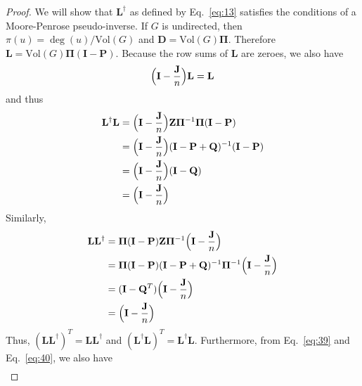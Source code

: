 \documentclass[10pt,twocolumn]{article}
\numberwithin{equation}{section}
\begin{document}
\begin{proof}
  We will show that $\mathbf{L}^{\dagger}$ as defined by
  Eq.~\eqref{eq:13} satisfies the conditions of a Moore-Penrose
  pseudo-inverse. If $G$ is undirected, then $\pi(u) =
  \deg(u)/\mathrm{Vol}(G)$ and $\mathbf{D} = \mathrm{Vol}(G)
  \bm{\Pi}$. Therefore $\mathbf{L} = \mathrm{Vol}(G) \bm{\Pi}(\mathbf{I} -
  \mathbf{P})$. Because the row sums of $\mathbf{L}$ are zeroes, we
  also have
  \begin{equation}
    \label{eq:38}
    \Bigl(\mathbf{I} - \frac{\mathbf{J}}{n}\Bigr)\mathbf{L} = \mathbf{L}
  \end{equation}
  and thus
  \begin{equation}
    \label{eq:39}
    \begin{split}
      \mathbf{L}^{\dagger}\mathbf{L} &= \Bigl(\mathbf{I} -
      \frac{\mathbf{J}}{n}\Bigr) \mathbf{Z}
      \bm{\Pi}^{-1} \bm{\Pi}(\mathbf{I} - \mathbf{P}) \\
      &= \Bigl(\mathbf{I} - \frac{\mathbf{J}}{n}\Bigr) (\mathbf{I} -
      \mathbf{P} + \mathbf{Q})^{-1}
      (\mathbf{I} - \mathbf{P}) \\
      &= \Bigl(\mathbf{I} - \frac{\mathbf{J}}{n}\Bigr)(\mathbf{I} - \mathbf{Q}) \\
      &= \Bigl(\mathbf{I} - \frac{\mathbf{J}}{n}\Bigr)
   \end{split}
  \end{equation}
  Similarly,
  \begin{equation}
    \label{eq:40}
    \begin{split}
      \mathbf{L}\mathbf{L}^{\dagger} &= \bm{\Pi}(\mathbf{I} -
      \mathbf{P}) \mathbf{Z}
      \bm{\Pi}^{-1} \Bigl(\mathbf{I} - \frac{\mathbf{J}}{n}\Bigr) \\
      &= \bm{\Pi}(\mathbf{I} - \mathbf{P}) (\mathbf{I} - \mathbf{P} +
      \mathbf{Q})^{-1}
      \bm{\Pi}^{-1} \Bigl(\mathbf{I} - \frac{\mathbf{J}}{n}\Bigr) \\
      &= (\mathbf{I} - \mathbf{Q}^{T})\Bigl(\mathbf{I} - \frac{\mathbf{J}}{n}\Bigr) \\
      &= \Bigl(\mathbf{I} - \frac{\mathbf{J}}{n}\Bigr)
   \end{split}
  \end{equation}
  Thus, $(\mathbf{L}\mathbf{L}^{\dagger})^{T} =
  \mathbf{L}\mathbf{L}^{\dagger}$ and
  $(\mathbf{L}^{\dagger}\mathbf{L})^{T} =
  \mathbf{L}^{\dagger}\mathbf{L}$. Furthermore, from
  Eq.~\eqref{eq:39} and Eq.~\eqref{eq:40}, we also have 
  \begin{align*}

\end{align*}
\end{proof}
\end{document}
